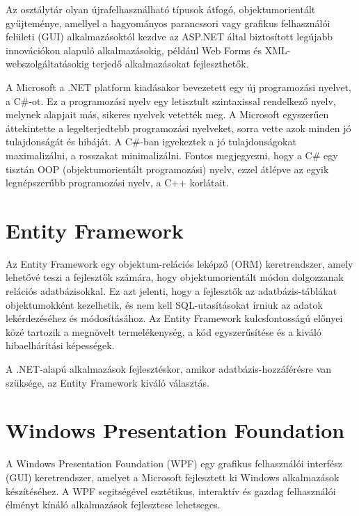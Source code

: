\documentclass[
]{thesis-ekf}
\theoremstyle{definition}
\theoremstyle{remark}
\begin{document}
Az osztálytár olyan újrafelhasználható típusok átfogó, objektumorientált gyűjteménye, amellyel a hagyományos parancssori vagy grafikus felhasználói felületi (GUI) alkalmazásoktól kezdve az ASP.NET által biztosított legújabb innovációkon alapuló alkalmazásokig, például Web Forms és XML-webszolgáltatásokig terjedő alkalmazásokat fejleszthetők.

A Microsoft a .NET platform kiadásakor bevezetett egy új programozási nyelvet, a C\#-ot. Ez a programozási nyelv egy letisztult szintaxissal rendelkező nyelv, melynek alapjait más, sikeres nyelvek vetették meg. A Microsoft egyszerűen áttekintette a legelterjedtebb programozási nyelveket, sorra vette azok minden jó tulajdonságát és hibáját. A C\#-ban igyekeztek a jó tulajdonságokat maximalizálni, a rosszakat minimalizálni. Fontos megjegyezni, hogy a C\# egy tisztán OOP (objektumorientált programozási) nyelv, ezzel átlépve az egyik legnépszerűbb programozási nyelv, a C++ korlátait.
\section{Entity Framework \cite{Entity}}
Az Entity Framework egy objektum-relációs leképző (ORM) keretrendszer, amely lehetővé teszi a fejlesztők számára, hogy objektumorientált módon dolgozzanak relációs adatbázisokkal. Ez azt jelenti, hogy a fejlesztők az adatbázis-táblákat objektumokként kezelhetik, és nem kell SQL-utasításokat írniuk az adatok lekérdezéséhez és módosításához. Az Entity Framework kulcsfontosságú előnyei közé tartozik a megnövelt termelékenység, a kód egyszerűsítése és a kiváló hibaelhárítási képességek. 

A .NET-alapú alkalmazások fejlesztéskor, amikor adatbázis-hozzáférésre van szüksége, az Entity Framework kiváló választás.
\section{Windows Presentation Foundation \cite{WPF}}
A Windows Presentation Foundation (WPF) egy grafikus felhasználói interfész (GUI) keretrendszer, amelyet a Microsoft fejlesztett ki Windows alkalmazások készítéséhez. A WPF segitségével esztétikus, interaktív és gazdag felhasználói élményt kínáló alkalmazások fejlesztese lehetseges.
\end{document}
